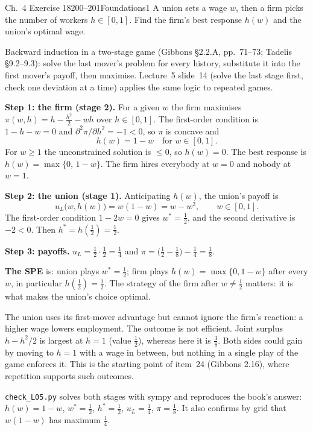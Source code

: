 \begin{exsol}{\MG{} Ch.~4 Exercise 18}{200--201}{Foundations}{1}
\asked A union sets a wage $w$, then a firm picks the number of workers $h \in [0,1]$. Find the
firm's best response $h(w)$ and the union's optimal wage.

\method Backward induction in a two-stage game (Gibbons \S2.2.A, pp.~71--73; Tadelis \S9.2--9.3):
solve the last mover's problem for every history, substitute it into the first mover's payoff, then
maximise. Lecture~5 slide~14 (solve the last stage first, check one deviation at a time) applies
the same logic to repeated games.

\solution
\textbf{Step 1: the firm (stage 2).} For a given $w$ the firm maximises
$\pi(w,h) = h - \tfrac{h^2}{2} - wh$ over $h \in [0,1]$. The first-order condition is $1 - h - w = 0$
and $\partial^2\pi/\partial h^2 = -1 < 0$, so $\pi$ is concave and
\[
  h(w) = 1 - w \quad \text{for } w \in [0,1].
\]
For $w \ge 1$ the unconstrained solution is $\le 0$, so $h(w) = 0$. The best response is
$h(w) = \max\{0,\,1-w\}$. The firm hires everybody at $w = 0$ and nobody at $w = 1$.

\textbf{Step 2: the union (stage 1).} Anticipating $h(w)$, the union's payoff is
\[
  u_L\bigl(w, h(w)\bigr) = w(1-w) = w - w^2 , \qquad w \in [0,1].
\]
The first-order condition $1 - 2w = 0$ gives $w^* = \frac12$, and the second derivative is $-2<0$.
Then $h^* = h(\frac12) = \frac12$.

\textbf{Step 3: payoffs.} $u_L = \frac12\cdot\frac12 = \frac14$ and
$\pi = \bigl(\frac12 - \frac18\bigr) - \frac14 = \frac18$.

\textbf{The SPE} is: union plays $w^* = \frac12$; firm plays $h(w) = \max\{0,1-w\}$ after every $w$,
in particular $h(\frac12) = \frac12$. The strategy of the firm after $w \ne \frac12$ matters: it is what
makes the union's choice optimal.

\interp The union uses its first-mover advantage but cannot ignore the firm's reaction: a higher wage
lowers employment. The outcome is not efficient. Joint surplus $h - h^2/2$ is largest at $h = 1$
(value $\frac12$), whereas here it is $\frac38$. Both sides could gain by moving to $h = 1$ with a wage
in between, but nothing in a single play of the game enforces it. This is the starting point of
item~24 (Gibbons 2.16), where repetition supports such outcomes.

\verify \texttt{check\_L05.py} solves both stages with sympy and reproduces the book's answer:
$h(w) = 1-w$, $w^* = \frac12$, $h^* = \frac12$, $u_L = \frac14$, $\pi = \frac18$. It also confirms
by grid that $w(1-w)$ has maximum $\frac14$.

\end{exsol}
